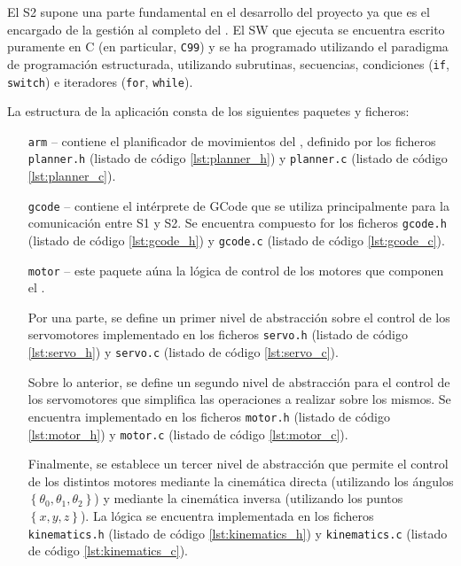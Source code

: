 El \ac{S2} supone una parte fundamental en el desarrollo del proyecto ya que es el
encargado de la gestión al completo del \pArm{}. El \ac{SW} que ejecuta se encuentra
escrito puramente en C (en particular, \texttt{C99}) y se ha programado utilizando
el paradigma de programación estructurada, utilizando subrutinas, secuencias, condiciones
(\texttt{if}, \texttt{switch}) e iteradores (\texttt{for},
\texttt{while})\cite{ProgramacionEstructurada2020}.

La estructura de la aplicación consta de los siguientes paquetes y ficheros:
\begin{itemize}
    \item[\texttt{arm} --] contiene el planificador de movimientos del \pArm{},
    definido por los ficheros \texttt{planner.h} (listado de código \ref{lst:planner_h})
    y \texttt{planner.c} (listado de código \ref{lst:planner_c}).

    \item[\texttt{gcode} --] contiene el intérprete de GCode que se utiliza
    principalmente para la comunicación entre \ac{S1} y \ac{S2}. Se encuentra
    compuesto for los ficheros \texttt{gcode.h} (listado de código
    \ref{lst:gcode_h}) y \texttt{gcode.c} (listado de código \ref{lst:gcode_c}).

    \item[\texttt{motor} --] este paquete aúna la lógica de control de los
    motores que componen el \pArm{}.

    Por una parte, se define un primer nivel de abstracción sobre el control
    de los servomotores implementado en los ficheros \texttt{servo.h} 
    (listado de código \ref{lst:servo_h}) y \texttt{servo.c} 
    (listado de código \ref{lst:servo_c}).

    Sobre lo anterior, se define un segundo nivel de abstracción para el
    control de los servomotores que simplifica las operaciones a realizar sobre
    los mismos. Se encuentra implementado en los ficheros \texttt{motor.h}
    (listado de código \ref{lst:motor_h}) y \texttt{motor.c} (listado de
    código \ref{lst:motor_c}).

    Finalmente, se establece un tercer nivel de abstracción que permite el
    control de los distintos motores mediante la cinemática directa
    (utilizando los ángulos $\left\{\theta_0, \theta_1, \theta_2\right\}$)
    y mediante la cinemática inversa (utilizando los puntos $\left\{x, y, z\right\}$).
    La lógica se encuentra implementada en los ficheros \texttt{kinematics.h}
    (listado de código \ref{lst:kinematics_h}) y \texttt{kinematics.c}
    (listado de código \ref{lst:kinematics_c}).


\end{itemize}
